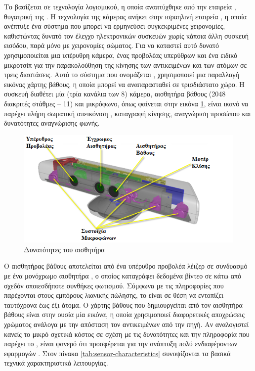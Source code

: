 Το  βασίζεται σε τεχνολογία λογισμικού, η οποία αναπτύχθηκε από την εταιρεία , θυγατρική της . Η τεχνολογία της κάμερας ανήκει στην ισραηλινή εταιρεία , η οποία ανέπτυξε ένα σύστημα που μπορεί να ερμηνεύσει συγκεκριμένες χειρονομίες, καθιστώντας δυνατό τον έλεγχο ηλεκτρονικών συσκευών χωρίς κάποια άλλη συσκευή εισόδου, παρά μόνο με χειρονομίες σώματος. Για να καταστεί αυτό δυνατό χρησιμοποιείται μια υπέρυθρη κάμερα, ένας προβολέας υπερύθρων και ένα ειδικό μικροτσίπ για την παρακολούθηση της κίνησης των αντικειμένων και των ατόμων σε τρεις διαστάσεις. Αυτό το σύστημα  που ονομάζεται , χρησιμοποιεί μια παραλλαγή εικόνας χάρτης βάθους, η οποία μπορεί να αναπαρασταθεί σε τρισδιάστατο χώρο. Η συσκευή διαθέτει μία  (τρία κανάλια των 8\-) κάμερα, αισθητήρα βάθους (2048 διακριτές στάθμες -- 11\-) και  μικρόφωνο, όπως φαίνεται στην εικόνα \ref{fig:kinect-characteristics}, είναι ικανό να παρέχει πλήρη σωματική απεικόνιση , καταγραφή κίνησης, αναγνώριση προσώπου και δυνατότητες αναγνώρισης φωνής.

\begin{figure}[H]
    \centering
    \includegraphics[width=.7\textwidth, keepaspectratio]{fig/kinect-characteristics.png}
    \caption{Δυνατότητες του αισθητήρα \protect\footnotemark}
    \label{fig:kinect-characteristics}
\end{figure}

Ο αισθητήρας βάθους αποτελείται από ένα υπέρυθρο προβολέα λέιζερ σε συνδυασμό με ένα μονόχρωμο αισθητήρα , ο οποίος καταγράφει δεδομένα βίντεο σε  κάτω από σχεδόν οποιεσδήποτε συνθήκες φωτισμού. Σύμφωνα με τις πληροφορίες που παρέχονται στους εμπόρους λιανικής πώλησης, το  είναι σε θέση να εντοπίζει ταυτόχρονα έως έξι άτομα. Ο χάρτης βάθους που δημιουργείται από τον αισθητήρα βάθους είναι στην ουσία μία εικόνα, η οποία χρησιμοποιεί διαφορετικές αποχρώσεις χρώματος ανάλογα με την απόσταση τον αντικειμένων από την πηγή. Αν αναλογιστεί κανείς το μικρό σχετικά κόστος σε σχέση με τις δυνατότητες και την πληροφορία που παρέχει το , είναι φανερό ότι προσφέρεται για την ανάπτυξη πολύ ενδιαφέροντων εφαρμογών \cite{jean13}. Στον πίνακα \ref{tab:sensor-characteristics} συνοψίζονται τα βασικά τεχνικά χαρακτηριστικά λειτουργίας.

